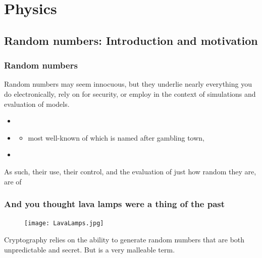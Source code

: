 \documentclass[hyperref={colorlinks=true}]{beamer}
\begin{document}
\section[Physics]{Physics}

\subsection[Random numbers: Introduction and motivation]{Random numbers: Introduction and motivation}

\begin{frame}%
  \frametitle{Random numbers}
  
  Random numbers may seem innocuous, but they underlie nearly everything you do electronically, rely on for security, or employ in the context of simulations and evaluation of models.
  
  \begin{itemize}
    \item {}
    \item {}
    \begin{itemize}
      \item  most well-known of which is named after gambling town, 
    \end{itemize}
    \item {}
  \end{itemize}

  As such, their use, their control, and the evaluation of just how random they are, are of 

\end{frame}


\begin{frame}%
  \frametitle{And you thought lava lamps were a thing of the past}
  
  \begin{figure}
    \centering
    \texttt{[image: LavaLamps.jpg]}
  \end{figure}

  Cryptography relies on the ability to generate random numbers that are both unpredictable and  secret. But  is a very malleable term. 

\end{frame}
\end{document}
